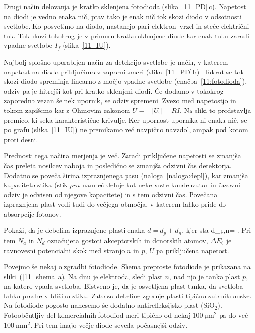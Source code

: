Drugi način delovanja je kratko sklenjena fotodioda (slika~\ref{11_PD}\,c).
 Napetost na diodi je
vedno enaka nič, prav tako je enak nič tok skozi diodo v odsotnosti svetlobe. 
Ko posvetimo na diodo, nastanejo pari elektron--vrzel in steče električni tok.
Tok skozi tokokrog je v primeru kratko sklenjene diode kar enak toku 
zaradi vpadne svetlobe $I_f$ (slika~\ref{11_IU}).

Najbolj splošno uporabljen način za detekcijo svetlobe je način, v katerem 
napetost na diodo priključimo v zaporni smeri (slika~\ref{11_PD}\,b).
Takrat se tok skozi diodo spreminja linearno z močjo vpadne svetlobe
(enačba~\ref{11:fotodioda}), odziv pa je hitrejši
kot pri kratko sklenjeni diodi. Če dodamo v tokokrog zaporedno vezan še nek upornik, se odziv
spremeni. Zvezo med napetostjo in tokom zapišemo kar z Ohmovim zakonom $U = -|U_0|-RI$. 
Na sliki to predstavlja premico, ki seka karakteristične krivulje. Ker upornost
upornika ni enaka nič, se po grafu (slika~\ref{11_IU}) ne premikamo več navpično navzdol, 
ampak pod kotom proti desni. 

Prednosti tega načina merjenja je več. Zaradi priključene napetosti se zmanjša čas preleta
nosilcev naboja in posledično se zmanjša odzivni čas detektorja.
Dodatno se poveča
širina izpraznjenega pasu (naloga~\ref{naloga:depl}), kar zmanjša kapaciteto stika (stik $p$-$n$ namreč deluje kot neke vrste 
kondenzator in časovni odziv je odvisen od njegove kapacitete) in s tem odzivni čas. Povečana
izpraznjena plast vodi tudi do večjega območja, v katerem lahko pride do absorpcije fotonov. 

\begin{definition}
\label{naloga:depl}
Pokaži, da je debelina izpraznjene plasti enaka $d = d_p+d_n$, kjer sta
\beq
d_{p,n}= .
\eeq
Pri tem $N_a$ in $N_d$ označujeta gostoti akceptorskih in donorskih atomov, $\Delta E_0$ je ravnovesni potencialni
skok med stranjo $n$ in $p$, $U$ pa priključena napetost.
\end{definition}

Povejmo še nekaj o zgradbi fotodiode. Shema preproste fotodiode je prikazana na sliki~(\ref{11_shema}\,a).
Na dnu je elektroda, sledi plast $n$, nad njo je tanka plast $p$, na katero vpada svetloba.
Bistveno je, da je osvetljena plast tanka, da svetloba lahko prodre v bližino stika. Zato so 
debeline zgornje plasti tipično submikronske. Na fotodiode pogosto nanesemo
še dodatno antirefleksijsko plast (SiO$_2$). 
Fotoobčutljiv del komercialnih fotodiod
meri tipično od nekaj $100~\si{\micro\meter}^2$ pa do več $100~\si{\milli\metre}^2$. Pri 
tem imajo večje diode seveda počasnejši odziv. 

